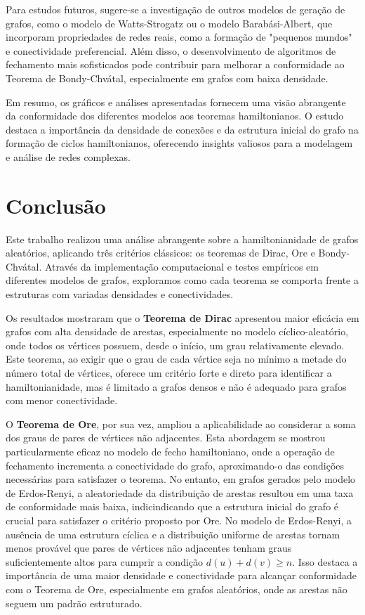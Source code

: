 \documentclass[12pt, openright, oneside, a4paper, chapter=TITLE, section=TITLE, subsection=TITLE, subsubsection=TITLE, brazil]{abntex2}
\begin{document}
Para estudos futuros, sugere-se a investigação de outros modelos de geração de grafos, como o modelo de Watts-Strogatz ou o modelo Barabási-Albert, que incorporam propriedades de redes reais, como a formação de "pequenos mundos" e conectividade preferencial. Além disso, o desenvolvimento de algoritmos de fechamento mais sofisticados pode contribuir para melhorar a conformidade ao Teorema de Bondy-Chvátal, especialmente em grafos com baixa densidade.

Em resumo, os gráficos e análises apresentadas fornecem uma visão abrangente da conformidade dos diferentes modelos aos teoremas hamiltonianos. O estudo destaca a importância da densidade de conexões e da estrutura inicial do grafo na formação de ciclos hamiltonianos, oferecendo insights valiosos para a modelagem e análise de redes complexas.

\chapter{Conclusão}

Este trabalho realizou uma análise abrangente sobre a hamiltonianidade de grafos aleatórios, aplicando três critérios clássicos: os teoremas de Dirac, Ore e Bondy-Chvátal. Através da implementação computacional e testes empíricos em diferentes modelos de grafos, exploramos como cada teorema se comporta frente a estruturas com variadas densidades e conectividades.

Os resultados mostraram que o \textbf{Teorema de Dirac} apresentou maior eficácia em grafos com alta densidade de arestas, especialmente no modelo cíclico-aleatório, onde todos os vértices possuem, desde o início, um grau relativamente elevado. Este teorema, ao exigir que o grau de cada vértice seja no mínimo a metade do número total de vértices, oferece um critério forte e direto para identificar a hamiltonianidade, mas é limitado a grafos densos e não é adequado para grafos com menor conectividade.

O \textbf{Teorema de Ore}, por sua vez, ampliou a aplicabilidade ao considerar a soma dos graus de pares de vértices não adjacentes. Esta abordagem se mostrou particularmente eficaz no modelo de fecho hamiltoniano, onde a operação de fechamento incrementa a conectividade do grafo, aproximando-o das condições necessárias para satisfazer o teorema. No entanto, em grafos gerados pelo modelo de Erdos-Renyi, a aleatoriedade da distribuição de arestas resultou em uma taxa de conformidade mais baixa, indicindicando que a estrutura inicial do grafo é crucial para satisfazer o critério proposto por Ore. No modelo de Erdos-Renyi, a ausência de uma estrutura cíclica e a distribuição uniforme de arestas tornam menos provável que pares de vértices não adjacentes tenham graus suficientemente altos para cumprir a condição $d(u) + d(v) \geq n$. Isso destaca a importância de uma maior densidade e conectividade para alcançar conformidade com o Teorema de Ore, especialmente em grafos aleatórios, onde as arestas não seguem um padrão estruturado.
\end{document}
